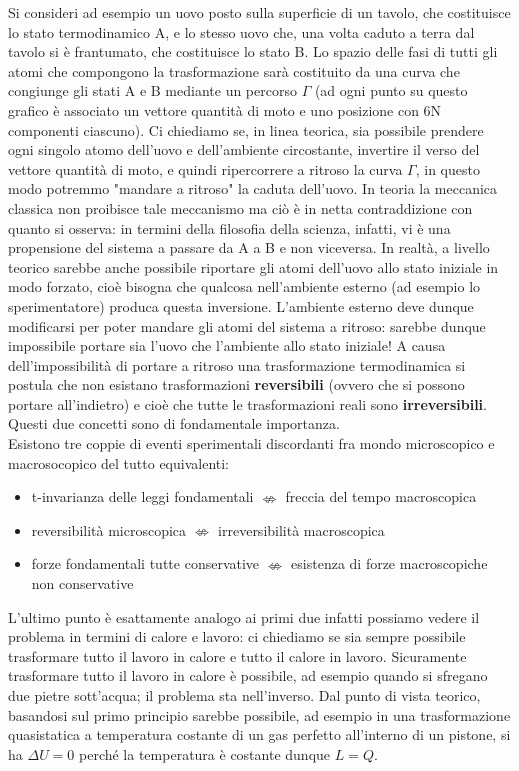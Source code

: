 \documentclass[10pt,a4paper]{article}
\begin{document}
Si consideri ad esempio un uovo posto sulla superficie di un tavolo, che costituisce lo stato termodinamico A, e lo stesso uovo che, una volta caduto a terra dal tavolo si è frantumato, che costituisce lo stato B. Lo spazio delle fasi di tutti gli atomi che compongono la trasformazione sarà costituito da una curva che congiunge gli stati A e B mediante un percorso $\Gamma$ (ad ogni punto su questo grafico è associato un vettore quantità di moto e uno posizione con 6N componenti ciascuno). Ci chiediamo se, in linea teorica, sia possibile prendere ogni singolo atomo dell'uovo e dell'ambiente circostante, invertire il verso del vettore quantità di moto, e quindi ripercorrere a ritroso la curva $\Gamma$, in questo modo potremmo "mandare a ritroso" la caduta dell'uovo. In teoria la meccanica classica non proibisce tale meccanismo ma ciò è in netta contraddizione con quanto si osserva: in termini della filosofia della scienza, infatti, vi è una propensione del sistema a passare da A a B e non viceversa. In realtà, a livello teorico sarebbe anche possibile riportare gli atomi dell'uovo allo stato iniziale in modo forzato, cioè bisogna che qualcosa nell'ambiente esterno (ad esempio lo sperimentatore) produca questa inversione. L'ambiente esterno deve dunque modificarsi per poter mandare gli atomi del sistema a ritroso: sarebbe dunque impossibile portare sia l'uovo che l'ambiente allo stato iniziale! A causa dell'impossibilità di portare a ritroso una trasformazione termodinamica si postula che non esistano trasformazioni \textbf{reversibili} (ovvero che si possono portare all'indietro) e cioè che tutte le trasformazioni reali sono \textbf{irreversibili}. Questi due concetti sono di fondamentale importanza.\\
Esistono tre coppie di eventi sperimentali discordanti fra mondo microscopico e macrosocopico del tutto equivalenti:
\begin{itemize}
	\item t-invarianza delle leggi fondamentali $\nLeftrightarrow$ freccia del tempo macroscopica
	\item reversibilità microscopica $\nLeftrightarrow$ irreversibilità macroscopica
	\item forze fondamentali tutte conservative $\nLeftrightarrow$ esistenza di forze macroscopiche non conservative
\end{itemize}
L'ultimo punto è esattamente analogo ai primi due infatti possiamo vedere il problema in termini di calore e lavoro: ci chiediamo se sia sempre possibile trasformare tutto il lavoro in calore e tutto il calore in lavoro. Sicuramente trasformare tutto il lavoro in calore è possibile, ad esempio quando si sfregano due pietre sott'acqua; il problema sta nell'inverso. Dal punto di vista teorico, basandosi sul primo principio sarebbe possibile, ad esempio in una trasformazione quasistatica a temperatura costante di un gas perfetto all'interno di un pistone, si ha $\Delta U = 0$ perché la temperatura è costante dunque \(L = Q\).
\end{document}
